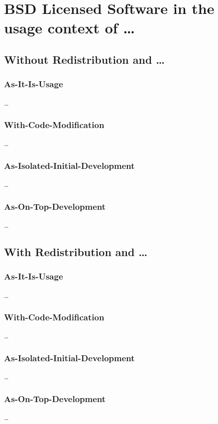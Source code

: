 %
%
%
%
%



\section{BSD Licensed Software in the usage context of \ldots}
\subsection{Without Redistribution and \ldots}
\subsubsection{As-It-Is-Usage}
\ldots
\subsubsection{With-Code-Modification}
\ldots
\subsubsection{As-Isolated-Initial-Development}
\ldots
\subsubsection{As-On-Top-Development}
\ldots

\subsection{With Redistribution and \ldots}
\subsubsection{As-It-Is-Usage}
\ldots
\subsubsection{With-Code-Modification}
\ldots
\subsubsection{As-Isolated-Initial-Development}
\ldots
\subsubsection{As-On-Top-Development}
\ldots


%
